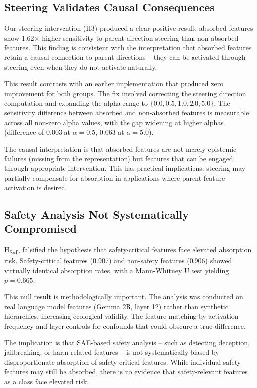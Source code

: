 \documentclass{article}
\begin{document}
\subsection{Steering Validates Causal Consequences}

Our steering intervention (H3) produced a clear positive result: absorbed features show 1.62$\times$ higher sensitivity to parent-direction steering than non-absorbed features. This finding is consistent with the interpretation that absorbed features retain a causal connection to parent directions -- they can be activated through steering even when they do not activate naturally.

This result contrasts with an earlier implementation that produced zero improvement for both groups. The fix involved correcting the steering direction computation and expanding the alpha range to $\{0.0, 0.5, 1.0, 2.0, 5.0\}$. The sensitivity difference between absorbed and non-absorbed features is measurable across all non-zero alpha values, with the gap widening at higher alphas (difference of 0.003 at $\alpha=0.5$, 0.063 at $\alpha=5.0$).

The causal interpretation is that absorbed features are not merely epistemic failures (missing from the representation) but features that can be engaged through appropriate intervention. This has practical implications: steering may partially compensate for absorption in applications where parent feature activation is desired.

\subsection{Safety Analysis Not Systematically Compromised}

H\textsubscript{Safe} falsified the hypothesis that safety-critical features face elevated absorption risk. Safety-critical features (0.907) and non-safety features (0.906) showed virtually identical absorption rates, with a Mann-Whitney U test yielding $p = 0.665$.

This null result is methodologically important. The analysis was conducted on real language model features (Gemma 2B, layer 12) rather than synthetic hierarchies, increasing ecological validity. The feature matching by activation frequency and layer controls for confounds that could obscure a true difference.

The implication is that SAE-based safety analysis -- such as detecting deception, jailbreaking, or harm-related features -- is not systematically biased by disproportionate absorption of safety-critical features. While individual safety features may still be absorbed, there is no evidence that safety-relevant features as a class face elevated risk.
\end{document}
